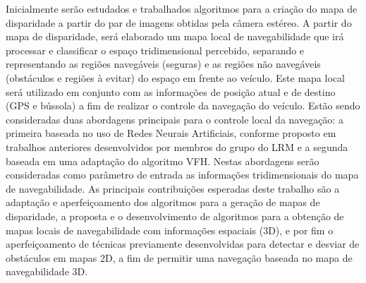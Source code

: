 \begin{resumo}
Inicialmente serão estudados e trabalhados algoritmos para a criação do mapa de
disparidade a partir do par de imagens obtidas pela câmera estéreo.
A partir do mapa de disparidade, será elaborado um mapa local de navegabilidade
que irá processar e classificar o espaço tridimensional percebido, separando e
representando as regiões navegáveis (seguras) e as regiões não navegáveis
(obstáculos e regiões à evitar) do espaço em frente ao veículo. Este mapa local
será utilizado em conjunto com as informações de posição atual e de destino (GPS
e bússola) a fim de realizar o controle da navegação do veículo. Estão sendo
consideradas duas abordagens principais para o controle local da navegação: a
primeira baseada no uso de Redes Neurais Artificiais, conforme proposto em
trabalhos anteriores desenvolvidos por membros do grupo do LRM e a segunda
baseada em uma adaptação do algoritmo VFH. Nestas abordagens serão consideradas
como parâmetro de entrada as informações tridimensionais do mapa de
navegabilidade.
As principais contribuições esperadas deste trabalho são a adaptação e
aperfeiçoamento dos algoritmos para a geração de mapas de disparidade, a
proposta e o desenvolvimento de algoritmos para a obtenção de mapas locais de
navegabilidade com informações espaciais (3D), e por fim o aperfeiçoamento de
técnicas previamente desenvolvidas para detectar e desviar de obstáculos em
mapas 2D, a fim de permitir uma navegação baseada no mapa de navegabilidade 3D.


\end{resumo}


